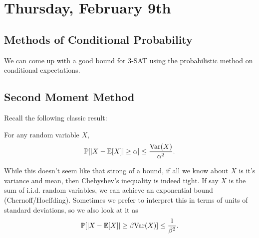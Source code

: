 \documentclass[11 pt]{scrartcl}
\begin{document}
\newpage
\section{Thursday, February 9th}
\subsection{Methods of Conditional Probability}
We can come up with a good bound for 3-SAT using the probabilistic method on conditional expectations. 

\subsection{Second Moment Method}
Recall the following classic result: 

\begin{theorem}
    For any random variable $X$, 
    \[ \mathbb P[|X - \mathbb E[X]| \geq \alpha] \leq \dfrac{\text{Var}(X)}{\alpha^2}.\] 
\end{theorem}

While this doesn't seem like that strong of a bound, if all we know about $X$ is it's variance and mean, then Chebyshev's inequality is indeed tight. If say $X$ is the sum of i.i.d. random variables, we can achieve an exponential bound (Chernoff/Hoeffding). Sometimes we prefer to interpret this in terms of units of standard deviations, so we also look at it as 
    \[ \mathbb P[|X - \mathbb E[X]| \geq \beta\text{Var}(X)] \leq \dfrac{1}{\beta^2}.\] 
\end{document}
